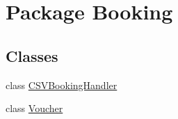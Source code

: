 \hypertarget{namespace_booking}{}\section{Package Booking}
\label{namespace_booking}
\subsection*{Classes}
\begin{DoxyCompactItemize}
\item 
class \hyperlink{class_booking_1_1_c_s_v_booking_handler}{C\+S\+V\+Booking\+Handler}
\item 
class \hyperlink{class_booking_1_1_voucher}{Voucher}
\end{DoxyCompactItemize}
